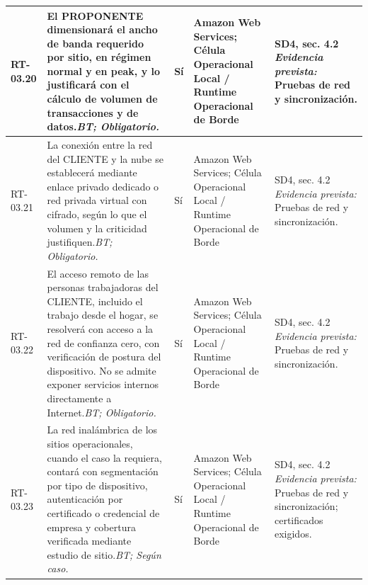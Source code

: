 \begin{paginaHorizontalSynaptix}
\begin{longtable}{|L{0.09\AnchoMatrizTDoce}|L{0.385\AnchoMatrizTDoce}|L{0.065\AnchoMatrizTDoce}|L{0.18\AnchoMatrizTDoce}|L{0.28\AnchoMatrizTDoce}|}
RT-\allowbreak{}03.\allowbreak{}20 &
El PROPONENTE dimensionará el ancho de banda requerido por sitio, en régimen normal y en peak, y lo justificará con el cálculo de volumen de transacciones y de datos.\newline\textit{BT; Obligatorio.} &
Sí &
Amazon Web Services; Célula Operacional Local / Runtime Operacional de Borde &
SD4, sec. 4.2 \newline\textit{Evidencia prevista:} Pruebas de red y sincronización. \\ \hline

RT-\allowbreak{}03.\allowbreak{}21 &
La conexión entre la red del CLIENTE y la nube se establecerá mediante enlace privado dedicado o red privada virtual con cifrado, según lo que el volumen y la criticidad justifiquen.\newline\textit{BT; Obligatorio.} &
Sí &
Amazon Web Services; Célula Operacional Local / Runtime Operacional de Borde &
SD4, sec. 4.2 \newline\textit{Evidencia prevista:} Pruebas de red y sincronización. \\ \hline

RT-\allowbreak{}03.\allowbreak{}22 &
El acceso remoto de las personas trabajadoras del CLIENTE, incluido el trabajo desde el hogar, se resolverá con acceso a la red de confianza cero, con verificación de postura del dispositivo. No se admite exponer servicios internos directamente a Internet.\newline\textit{BT; Obligatorio.} &
Sí &
Amazon Web Services; Célula Operacional Local / Runtime Operacional de Borde &
SD4, sec. 4.2 \newline\textit{Evidencia prevista:} Pruebas de red y sincronización. \\ \hline

RT-\allowbreak{}03.\allowbreak{}23 &
La red inalámbrica de los sitios operacionales, cuando el caso la requiera, contará con segmentación por tipo de dispositivo, autenticación por certificado o credencial de empresa y cobertura verificada mediante estudio de sitio.\newline\textit{BT; Según caso.} &
Sí &
Amazon Web Services; Célula Operacional Local / Runtime Operacional de Borde &
SD4, sec. 4.2 \newline\textit{Evidencia prevista:} Pruebas de red y sincronización; certificados exigidos. \\ \hline


\end{longtable}
\end{paginaHorizontalSynaptix}

